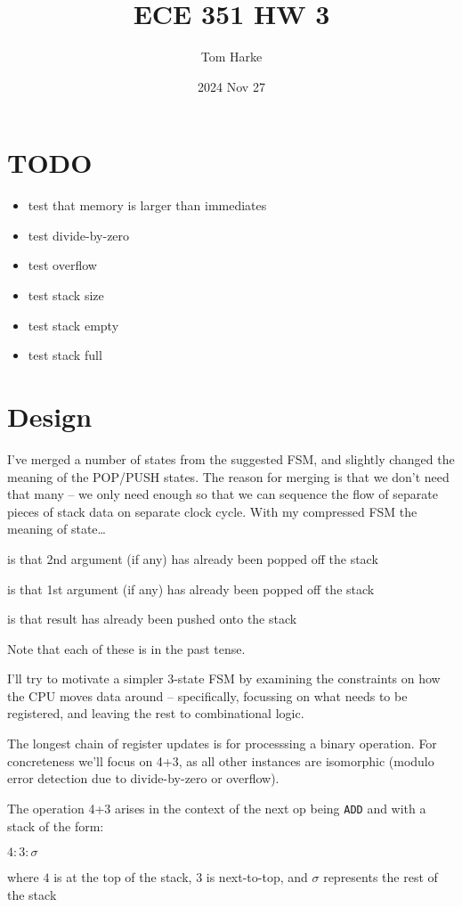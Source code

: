 \documentclass{article}
\title{ECE 351 HW 3}
\date{2024 Nov 27}
\author{Tom Harke}
\begin{document}
\maketitle

\begin{multicols}{2}

\section{TODO}
\begin{itemize}
\item test that memory is larger than immediates
\item test divide-by-zero
\item test overflow
\item test stack size
\item test stack empty
\item test stack full
\end{itemize}
\section{Design}
I've merged a number of states from the suggested FSM, and slightly changed the meaning of the POP/PUSH states.
The reason for merging is that we don't need that many
	-- we only need enough so that we can sequence the flow of separate pieces of stack data on separate clock cycle.
With my compressed FSM the meaning of state\dots
\begin{description}[noitemsep]
\item[POP2] is that 2nd argument (if any) has already been popped off the stack
\item[POP1] is that 1st argument (if any) has already been popped off the stack
\item[PUSH] is that result has already been pushed onto the stack
\end{description}
Note that each of these is in the past tense.

I'll try to motivate a simpler 3-state FSM by
examining the constraints on how the CPU moves data
around -- specifically, focussing on what needs to be
registered, and leaving the rest to combinational logic.

The longest chain of register updates is for processsing
a binary operation.
For concreteness we'll focus on 4+3, as all other instances
are isomorphic (modulo error detection due
to divide-by-zero or overflow).

The operation 4+3 arises in the context of the next op being
\verb'ADD' and with a stack of the form:
\begin{center}
	$4:3:\sigma$
\end{center}
where $4$ is at the top of the stack, $3$ is next-to-top,
and $\sigma$ represents the rest of the stack


\end{multicols}
\end{document}
